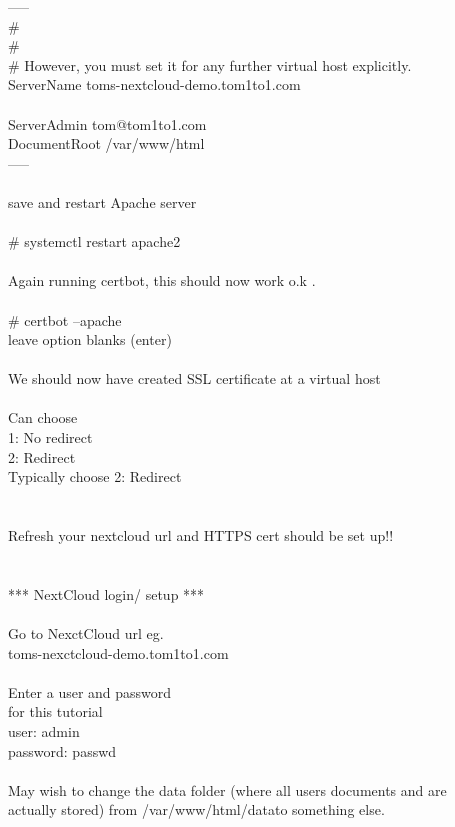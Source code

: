 \documentclass[10pt,a4paper]{article}
\begin{document}
{	-----\\
	\#\\
	\#\\
	\# However, you must set it for any further virtual host explicitly.\\
	ServerName toms-nextcloud-demo.tom1to1.com\\
	\\
	ServerAdmin tom@tom1to1.com}{\large \\
	DocumentRoot /var/www/html}{\large \\
	-----\\
	\\
	save and restart Apache server\\
\\
	\# systemctl restart apache2\\
\\
	Again running certbot, this should now work o.k .\\
\\
	\# certbot --apache\\
	leave option blanks (enter)\\
\\
	We should now have created SSL certificate at a virtual host\\
\\
	Can choose \\
		1: No redirect\\
		2: Redirect\\
	Typically choose 2: Redirect\\
\\
	\\
	Refresh your nextcloud url and HTTPS cert should be set up!!\\
\\
	\\
*** NextCloud login/ setup ***\\
\\
	Go to NexctCloud url eg. \\
		toms-nexctcloud-demo.tom1to1.com\\
\\
	Enter a user and password\\
	for this tutorial\\
	user: admin\\
	password: passwd\\
\\
	May wish to change the data folder (where all users documents and are \\
	actually stored) from /var/www/html/data}{\large   to something else.\\
}
\end{document}
